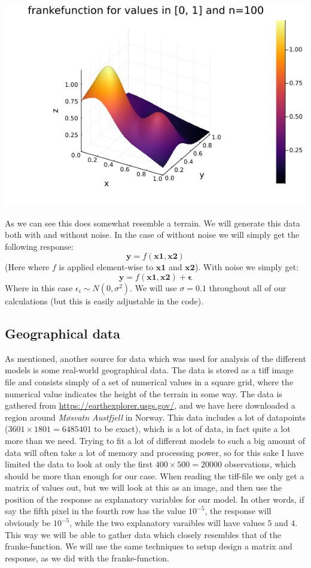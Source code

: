 \documentclass{article}
\begin{document}
\includegraphics[scale=0.5]{frankefunction}

As we can see this does somewhat resemble a terrain. We will generate this data
both with and without noise.  In the case of without noise we will simply get
the following response:
$$\mathbf{y} = f(\mathbf{x1}, \mathbf{x2})$$
(Here where $f$ is applied element-wise to $\mathbf{x1}$ and $\mathbf{x2}$).
With noise we simply get:
$$\mathbf{y} = f(\mathbf{x1}, \mathbf{x2}) + \mathbf{\epsilon}$$
Where in this case $\epsilon_i \sim N(0, \sigma^2)$. We will use $\sigma = 0.1$
throughout all of our calculations (but this is easily adjustable in the code).

\subsection{Geographical data}
As mentioned, another source for data which was used for analysis of the
different models is some real-world geographical data. The data is stored as a
tiff image file and consists simply of a set of numerical values in a square
grid, where the numerical value indicates the height of the terrain in some way.
The data is gathered from \url{https://earthexplorer.usgs.gov/}, and we have
here downloaded a region around \textit{Møsvatn Austfjell} in Norway. This data
includes a lot of datapoints ($3601\times 1801 = 6485401$ to be exact), which is
a lot of data, in fact quite a lot more than we need. Trying to fit a lot of
different models to such a big amount of data will often take a lot of memory
and processing power, so for this sake I have limited the data to look at only
the first $400\times 500 = 20000$ observations, which should be more than enough
for our case. When reading the tiff-file we only get a matrix of values out, but
we will look at this as an image, and then use the position of the response as
explanatory variables for our model. In other words, if say the fifth pixel in
the fourth row has the value $10^{-5}$, the response will obviously be
$10^{-5}$, while the two explanatory varaibles will have values $5$ and $4$.
This way we will be able to gather data which closely resembles that of the
franke-function. We will use the same techniques to setup design a matrix and
response, as we did with the franke-function.
\end{document}
